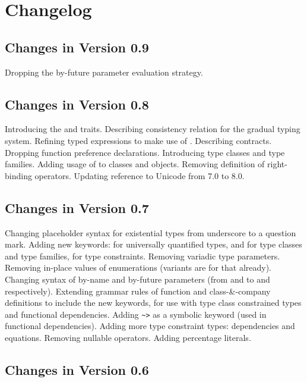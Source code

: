 
\chapter{Changelog}
\label{sec:changelog}

\section*{Changes in Version 0.9}

Dropping the by-future parameter evaluation strategy. 

\section*{Changes in Version 0.8}

Introducing the  and  traits. Describing consistency relation for the gradual typing system. Refining typed expressions to make use of . Describing contracts. Dropping function preference declarations. Introducing type classes and type families. Adding usage of  to classes and objects. Removing definition of right-binding operators. Updating reference to Unicode from 7.0 to 8.0. 

\section*{Changes in Version 0.7}

Changing placeholder syntax for existential types from underscore to a question mark. Adding new keywords:  for universally quantified types,  and  for type classes and type families,  for type constraints. Removing variadic type parameters. Removing in-place values of enumerations (variants are for that already). Changing syntax of by-name and by-future parameters (from \code{=>} and \code{=>>} to \code{->} and \code{->>} respectively). Extending grammar rules of function and class-\&-company definitions to include the new keywords, for use with type class constrained types and functional dependencies. Adding \lstinline!~>! as a symbolic keyword (used in functional dependencies). Adding more type constraint types: dependencies and equations. Removing nullable operators. Adding percentage literals. 

\section*{Changes in Version 0.6}

